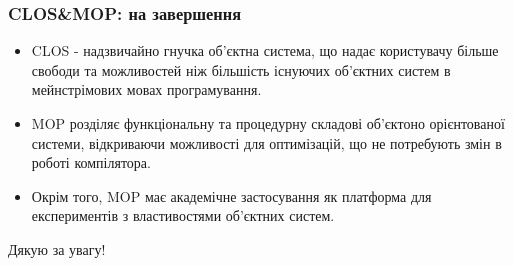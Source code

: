\documentclass{beamer}
\begin{document}
\begin{frame}[fragile]
  \frametitle{CLOS\&MOP: на завершення}
  \begin{itemize}
  \item CLOS - надзвичайно гнучка об'єктна система, що надає користувачу більше
    свободи та можливостей ніж більшість існуючих об'єктних систем в
    мейнстрімових мовах програмування.
  \item MOP розділяє функціональну та процедурну складові об'єктоно орієнтованої
    системи, відкриваючи можливості для оптимізацій, що не потребують змін в
    роботі компілятора.
  \item Окрім того, MOP має академічне застосування як платформа для
    експериментів з властивостями об'єктних систем.
  \end{itemize}
\end{frame}

\begin{frame}[fragile]
  \begin{center}
    \huge{Дякую за увагу!}
  \end{center}
\end{frame}

\printbibliography
\end{document}
